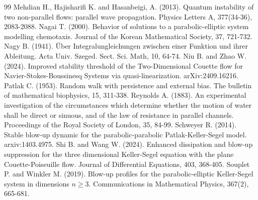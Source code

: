 \documentclass[12pt, reqno]{amsart}
\numberwithin{equation}{section}
\begin{document}
\begin{thebibliography}{99}
		  Mehdian H., Hajisharifi K. and Hasanbeigi, A. (2013). Quantum instability of two non-parallel flows: parallel wave propagation. Physics Letters A, 377(34-36), 2083-2088.
		 Nagai T. (2000). Behavior of solutions to a parabolic-elliptic system modelling chemotaxis. Journal of the Korean Mathematical Society, 37, 721-732.
		 Nagy B. (1941). \"{U}ber Integralungleichungen zwischen einer Funktion und ihrer Ableitung. Acta Univ. Szeged. Sect. Sci. Math, 10, 64-74.
		Niu B.  and Zhao W.  (2024).
		Improved stability threshold of the Two-Dimensional Couette flow for Navier-Stokes-Boussinesq Systems via quasi-linearization. arXiv:2409.16216.
		Patlak C. (1953). Random walk with persistence and external bias. 
		The bulletin of mathematical biophysics, 15, 311-338.
		 Reynolds A. (1883). An experimental investigation of the circumstances which determine whether the motion of water shall be direct or sinuous, and of the law of resistance in parallel channels. Proceedings of the Royal Society of London, 35, 84-99.
		Schweyer R. (2014). Stable blow-up dynamic for the parabolic-parabolic Patlak-Keller-Segel model.
		arxiv:1403.4975.
		 Shi B. and Wang W. (2024). Enhanced dissipation and blow-up suppression for the three dimensional Keller-Segel equation with the plane Couette-Poiseuille flow. Journal of Differential Equations, 403, 368-405.
		 Souplet P. and Winkler M. (2019). Blow-up profiles for the parabolic-elliptic Keller-Segel system in dimensions $n\geq3$. Communications in Mathematical Physics, 367(2), 665-681.


\end{thebibliography}
\end{document}
